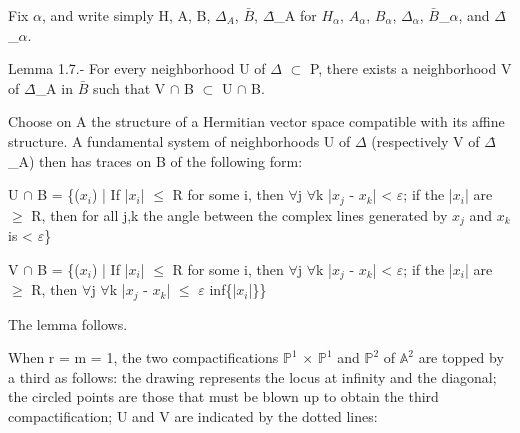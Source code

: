 \documentclass[10pt,a4paper]{article}
\begin{document}
\begin{adjustbox}{max totalsize={\textwidth}{0.945\textheight},center}
\begin{minipage}{\textwidth}
\noindent Fix \ensuremath{α}, and write simply H, A, B, \ensuremath{Δ_A}, \ensuremath{\bar{B}}, \ensuremath{Δ}̄\allowbreak\_A for \ensuremath{H_α}, \ensuremath{A_α}, \ensuremath{B_α}, \ensuremath{Δ_α}, \ensuremath{\bar{B}}\allowbreak\_\ensuremath{α}, and \ensuremath{Δ}̄\allowbreak\_\ensuremath{α}.\par\smallskip
\noindent Lemma 1.7.- For every neighborhood U of \ensuremath{Δ} \ensuremath{⊂} P, there exists a neighborhood V of \ensuremath{Δ}̄\allowbreak\_A in \ensuremath{\bar{B}} such that V \ensuremath{∩} B \ensuremath{⊂} U \ensuremath{∩} B.\par\smallskip
\noindent Choose on A the structure of a Hermitian vector space compatible with its affine structure. A fundamental system of neighborhoods U of \ensuremath{Δ} (respectively V of \ensuremath{Δ}̄\allowbreak\_A) then has traces on B of the following form:\par\smallskip
\noindent U \ensuremath{∩} B = \{(\ensuremath{x_i}) | If |\ensuremath{x_i}| \ensuremath{≤} R for some i, then \ensuremath{∀}j \ensuremath{∀}k |\ensuremath{x_j} - \ensuremath{x_k}| < \ensuremath{ε}; if the |\ensuremath{x_i}| are \ensuremath{≥} R, then for all j,k the angle between the complex lines generated by \ensuremath{x_j} and \ensuremath{x_k} is < \ensuremath{ε}\}\par\smallskip
\noindent V \ensuremath{∩} B = \{(\ensuremath{x_i}) | If |\ensuremath{x_i}| \ensuremath{≤} R for some i, then \ensuremath{∀}j \ensuremath{∀}k |\ensuremath{x_j} - \ensuremath{x_k}| < \ensuremath{ε}; if the |\ensuremath{x_i}| are \ensuremath{≥} R, then \ensuremath{∀}j \ensuremath{∀}k |\ensuremath{x_j} - \ensuremath{x_k}| \ensuremath{≤} \ensuremath{ε} inf\{|\ensuremath{x_i}|\}\}\par\smallskip
\noindent The lemma follows.\par\smallskip
\noindent When r = m = 1, the two compactifications \ensuremath{ℙ^1} \ensuremath{×} \ensuremath{ℙ^1} and \ensuremath{ℙ^2} of \ensuremath{𝔸^2} are topped by a third as follows: the drawing represents the locus at infinity and the diagonal; the circled points are those that must be blown up to obtain the third compactification; U and V are indicated by the dotted lines:\par\smallskip
\end{minipage}
\end{adjustbox}
\newpage
\end{document}
